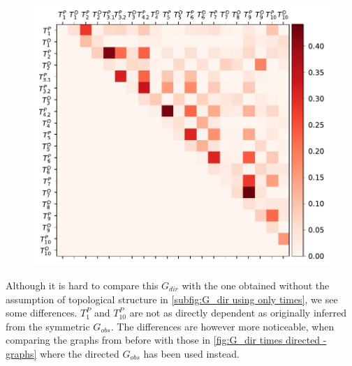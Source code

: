 \documentclass[../Thesis.tex]{subfiles}
\begin{document}
\begin{figure}[ht]
    \centering
    \includegraphics[width = .8\linewidth]{figures/Cycle data/G_dir times - directed.pdf}
    \caption{}
    \label{fig:G_dir times - directed}
\end{figure}
Although it is hard to compare this $G_{dir}$ with the one obtained without the assumption of topological structure in \autoref{subfig:G_dir using only times}, we see some differences. $T^P_1$ and $T^P_{10}$ are not as directly dependent as originally inferred from the symmetric $G_{obs}$. The differences are however more noticeable, when comparing the graphs from before with those in \autoref{fig:G_dir times directed - graphs} where the directed $G_{obs}$ has been used instead.
\end{document}
